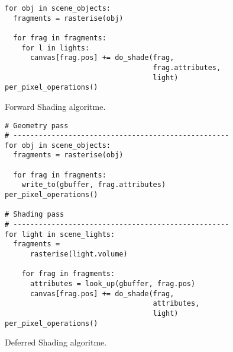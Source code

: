 \begin{listing}[tb]
  \begin{verbatim}
for obj in scene_objects:
  fragments = rasterise(obj)

  for frag in fragments:
    for l in lights:
      canvas[frag.pos] += do_shade(frag,
                                   frag.attributes,
                                   light)
per_pixel_operations()
  \end{verbatim}
  \caption{Forward Shading algoritme.}
  \label{lst:fds-algorithm:forward}
\end{listing}

\begin{listing}[tb]
  \begin{verbatim}
# Geometry pass
# ---------------------------------------------------
for obj in scene_objects:
  fragments = rasterise(obj)
    
  for frag in fragments:
    write_to(gbuffer, frag.attributes) 
per_pixel_operations()

# Shading pass
# ---------------------------------------------------
for light in scene_lights:
  fragments =
      rasterise(light.volume)
    
    for frag in fragments:
      attributes = look_up(gbuffer, frag.pos)
      canvas[frag.pos] += do_shade(frag,
                                   attributes,
                                   light)
per_pixel_operations()
  \end{verbatim}
  \caption{Deferred Shading algoritme.}
  \label{lst:fds-algorithm:deferred}
\end{listing}

